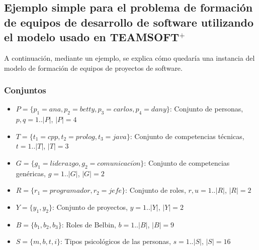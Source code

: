 \subsection{Ejemplo simple para el problema de formación de equipos de desarrollo de software utilizando el modelo usado en TEAMSOFT$^+$} \label{ej-sof}

A continuación, mediante un ejemplo, se explica cómo quedaría una instancia del modelo de formación de equipos de proyectos de software.



\subsubsection{Conjuntos}
\begin{itemize}
  \item $P=\{p_1=ana, p_2=betty, p_3=carlos, p_4=dany\}$: Conjunto de personas, $p, q= 1.. |P|$, $|P|=4$
  \item $T=\{t_1=cpp, t_2=prolog, t_3=java\}$: Conjunto de competencias técnicas, $t= 1.. |T|$, $|T|=3$
  \item $G=\{g_1=liderazgo, g_2=comunicaci\acute{o}n\}$: Conjunto de competencias genéricas, $g= 1.. |G|$, $|G|=2$
  \item $R=\{r_1=programador,r_2=jefe\}$: Conjunto de roles, $r,u= 1.. |R|$, $|R|=2$
  \item $Y=\{y_1,y_2\}$: Conjunto de proyectos, $y= 1.. |Y|$, $|Y|=2$
  \item $B=\{b_1,b_2,b_3\}$: Roles de Belbin, $b= 1.. |B|$, $|B|=9$
  \item $S= \{m,b,t,i\}$: Tipos psicológicos de las personas, $s= 1.. |S| $, $|S|=16$
   
\end{itemize}

